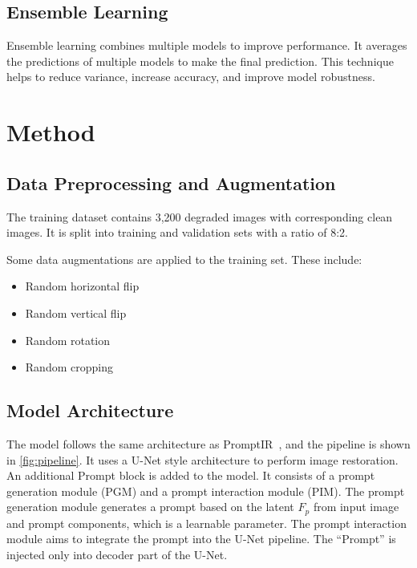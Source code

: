 \documentclass[10pt,twocolumn,letterpaper]{article}
\begin{document}
\subsection{Ensemble Learning}

Ensemble learning combines multiple models to improve performance. It averages
the predictions of multiple models to make the final prediction. This technique
helps to reduce variance, increase accuracy, and improve model robustness.



\section{Method}
\label{sec:method}

\subsection{Data Preprocessing and Augmentation}
\label{subsec:aug}

The training dataset contains 3,200 degraded images with corresponding clean
images. It is split into training and validation sets with a ratio of 8:2.

Some data augmentations are applied to the training set. These include:
\begin{itemize}
  \setlength\itemsep{0pt}
  \item Random horizontal flip
  \item Random vertical flip
  \item Random rotation
  \item Random cropping
\end{itemize}

\subsection{Model Architecture}

The model follows the same architecture as PromptIR~\cite{PromptIR}, and the pipeline
is shown in \cref{fig:pipeline}. It uses a U-Net style architecture to perform
image restoration. An additional Prompt block is added to the model. It consists of a
prompt generation module (PGM) and a prompt interaction module (PIM). The prompt
generation module generates a prompt based on the latent $F_{p}$ from input image
and prompt components, which is a learnable parameter. The prompt interaction module
aims to integrate the prompt into the U-Net pipeline. The ``Prompt'' is injected
only into decoder part of the U-Net.
\end{document}
